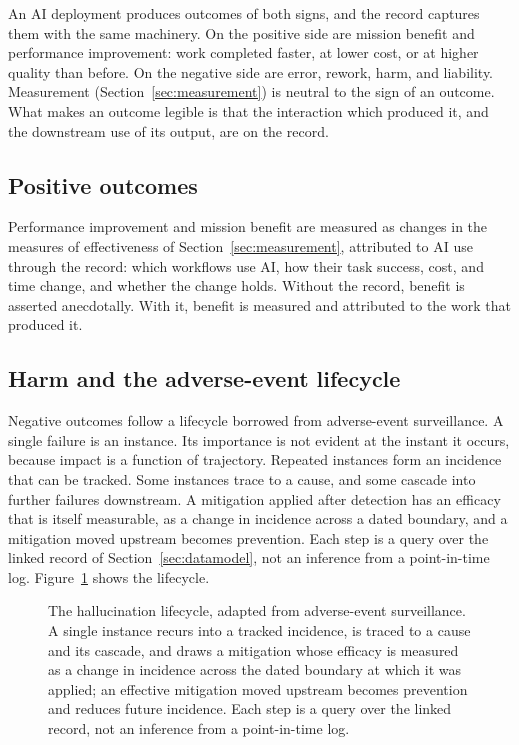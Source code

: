 \documentclass[11pt]{article}
\begin{document}
An AI deployment produces outcomes of both signs, and the record captures them
with the same machinery. On the positive side are mission benefit and
performance improvement: work completed faster, at lower cost, or at higher
quality than before. On the negative side are error, rework, harm, and
liability. Measurement (Section~\ref{sec:measurement}) is neutral to the sign of
an outcome. What makes an outcome legible is that the interaction which produced
it, and the downstream use of its output, are on the record.

\subsection{Positive outcomes}

Performance improvement and mission benefit are measured as changes in the
measures of effectiveness of Section~\ref{sec:measurement}, attributed to AI use
through the record: which workflows use AI, how their task success, cost, and
time change, and whether the change holds. Without the record, benefit is
asserted anecdotally. With it, benefit is measured and attributed to the work
that produced it.

\subsection{Harm and the adverse-event lifecycle}

Negative outcomes follow a lifecycle borrowed from adverse-event surveillance. A
single failure is an instance. Its importance is not evident at the instant it
occurs, because impact is a function of trajectory. Repeated instances form an
incidence that can be tracked. Some instances trace to a cause, and some cascade
into further failures downstream. A mitigation applied after detection has an
efficacy that is itself measurable, as a change in incidence across a dated
boundary, and a mitigation moved upstream becomes prevention. Each step is a
query over the linked record of Section~\ref{sec:datamodel}, not an inference
from a point-in-time log. Figure~\ref{fig:lifecycle} shows the lifecycle.

\begin{figure}[t]
\centering
\resizebox{\textwidth}{!}{}
\caption{The hallucination lifecycle, adapted from adverse-event surveillance. A
single instance recurs into a tracked incidence, is traced to a cause and its
cascade, and draws a mitigation whose efficacy is measured as a change in
incidence across the dated boundary at which it was applied; an effective
mitigation moved upstream becomes prevention and reduces future incidence. Each
step is a query over the linked record, not an inference from a point-in-time log.}
\label{fig:lifecycle}
\end{figure}
\end{document}
